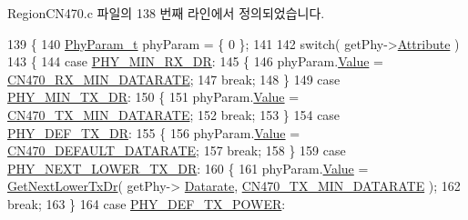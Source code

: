 Region\+C\+N470.\+c 파일의 138 번째 라인에서 정의되었습니다.


\begin{DoxyCode}
139 \{
140     \mbox{\hyperlink{unionu_phy_param}{PhyParam\_t}} phyParam = \{ 0 \};
141 
142     \textcolor{keywordflow}{switch}( getPhy->\mbox{\hyperlink{structs_get_phy_params_abdcb168ffd6913b85e2f635d7a475f2d}{Attribute}} )
143     \{
144         \textcolor{keywordflow}{case} \mbox{\hyperlink{group___r_e_g_i_o_n_gga51cbe8f5433d914fe9cf81b451de2c2da91cb5d84f937c32cd635dd7efe7a9d3a}{PHY\_MIN\_RX\_DR}}:
145         \{
146             phyParam.\mbox{\hyperlink{unionu_phy_param_a8e0dcce3428a8051614e852b8836d0d1}{Value}} = \mbox{\hyperlink{group___r_e_g_i_o_n_c_n470_ga5aa969a4651406bcd74903035a8cfc4f}{CN470\_RX\_MIN\_DATARATE}};
147             \textcolor{keywordflow}{break};
148         \}
149         \textcolor{keywordflow}{case} \mbox{\hyperlink{group___r_e_g_i_o_n_gga51cbe8f5433d914fe9cf81b451de2c2daace3e56c88b40def8ed6a9106871e7de}{PHY\_MIN\_TX\_DR}}:
150         \{
151             phyParam.\mbox{\hyperlink{unionu_phy_param_a8e0dcce3428a8051614e852b8836d0d1}{Value}} = \mbox{\hyperlink{group___r_e_g_i_o_n_c_n470_gafc089f5bdc4ad69267f562d1fda11f79}{CN470\_TX\_MIN\_DATARATE}};
152             \textcolor{keywordflow}{break};
153         \}
154         \textcolor{keywordflow}{case} \mbox{\hyperlink{group___r_e_g_i_o_n_gga51cbe8f5433d914fe9cf81b451de2c2da70c3923333165960549162e3dcf10467}{PHY\_DEF\_TX\_DR}}:
155         \{
156             phyParam.\mbox{\hyperlink{unionu_phy_param_a8e0dcce3428a8051614e852b8836d0d1}{Value}} = \mbox{\hyperlink{group___r_e_g_i_o_n_c_n470_gab5525fe4b5cbe390c85fc1157a27860f}{CN470\_DEFAULT\_DATARATE}};
157             \textcolor{keywordflow}{break};
158         \}
159         \textcolor{keywordflow}{case} \mbox{\hyperlink{group___r_e_g_i_o_n_gga51cbe8f5433d914fe9cf81b451de2c2dac002e7e492cf30dbf9c544b062f5cc8a}{PHY\_NEXT\_LOWER\_TX\_DR}}:
160         \{
161             phyParam.\mbox{\hyperlink{unionu_phy_param_a8e0dcce3428a8051614e852b8836d0d1}{Value}} = \mbox{\hyperlink{_region_c_n470_8c_ae06574681e2f7c3f3e604878c81743aa}{GetNextLowerTxDr}}( getPhy->
      \mbox{\hyperlink{structs_get_phy_params_ae2f6080f3aa0e9485c55513ca56bb24d}{Datarate}}, \mbox{\hyperlink{group___r_e_g_i_o_n_c_n470_gafc089f5bdc4ad69267f562d1fda11f79}{CN470\_TX\_MIN\_DATARATE}} );
162             \textcolor{keywordflow}{break};
163         \}
164         \textcolor{keywordflow}{case} \mbox{\hyperlink{group___r_e_g_i_o_n_gga51cbe8f5433d914fe9cf81b451de2c2da18ae0d314f20c212f9e40207099ab1bb}{PHY\_DEF\_TX\_POWER}}:

\end{DoxyCode}
